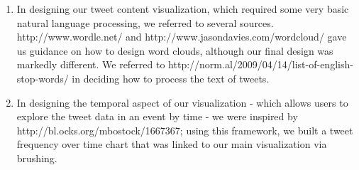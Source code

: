 \documentclass[pdftex,12pt,a4paper]{article}
\begin{document}
\begin{enumerate}
\item In designing our tweet content visualization, which required some very basic natural language processing, we referred to several sources. \\ http://www.wordle.net/ and http://www.jasondavies.com/wordcloud/ gave us guidance on how to design word clouds, although our final design was markedly different. We referred to http://norm.al/2009/04/14/list-of-english-stop-words/ in deciding how to process the text of tweets.
\item In designing the temporal aspect of our visualization - which allows users to explore the tweet data in an event by time - we were inspired by http://bl.ocks.org/mbostock/1667367; using this framework, we built a tweet frequency over time chart that was linked to our main visualization via brushing. 
\end{enumerate}
\end{document}
